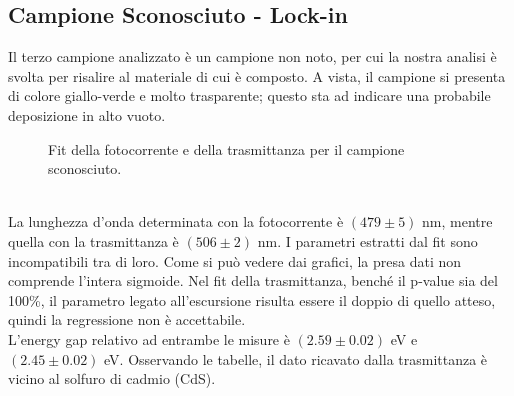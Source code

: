 \documentclass[11pt]{article} %
\begin{document}
\subsection{Campione Sconosciuto - Lock-in}
Il terzo campione analizzato è un campione non noto, per cui la nostra analisi è svolta per risalire al materiale di cui è composto. A vista, il campione si presenta di colore giallo-verde e molto trasparente; questo sta ad indicare una probabile deposizione in alto vuoto. 
\begin{figure}[!h]
\centering
\caption{Fit della fotocorrente e della trasmittanza per il campione sconosciuto.}
\end{figure}
\\La lunghezza d'onda determinata con la fotocorrente è $\left(479\pm5\right)$ nm, mentre quella con la trasmittanza è $\left(506\pm2\right)$ nm.
I parametri estratti dal fit sono incompatibili tra di loro. Come si può vedere dai grafici, la presa dati non comprende l'intera sigmoide. Nel fit della trasmittanza, benché il p-value sia del 100\%, il parametro legato all'escursione risulta essere il doppio di quello atteso, quindi la regressione non è accettabile. \\L'energy gap relativo ad entrambe le misure è $\left(2.59\pm0.02\right)$ eV e $\left(2.45\pm0.02\right)$ eV. Osservando le tabelle, il dato ricavato dalla trasmittanza è vicino al solfuro di cadmio (CdS).
\end{document}
